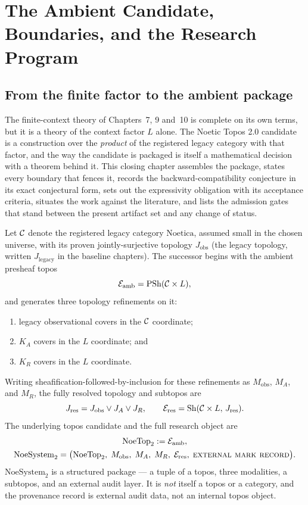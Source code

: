 \chapter{The Ambient Candidate, Boundaries, and the Research Program}
\label{ch12:chapter}

\section{From the finite factor to the ambient package}
\label{ch12:sec:ambient}

The finite-context theory of Chapters~7, 9 and~10 is complete on its own
terms, but it is a theory of the context factor $L$ alone. The Noetic Topos
2.0 candidate is a construction over the \emph{product} of the registered
legacy category with that factor, and the way the candidate is packaged is
itself a mathematical decision with a theorem behind it. This closing
chapter assembles the package, states every boundary that fences it, records
the backward-compatibility conjecture in its exact conjectural form, sets
out the expressivity obligation with its acceptance criteria, situates the
work against the literature, and lists the admission gates that stand
between the present artifact set and any change of status.

\begin{construction}
\label{ch12:con:package}
Let $\mathcal{C}$ denote the registered legacy category $\mathrm{Noetica}$, assumed
small in the chosen universe, with its proven jointly-surjective topology
$J_{\mathrm{obs}}$ (the legacy topology, written $J_{\mathrm{legacy}}$ in
the baseline chapters). The successor begins with the ambient presheaf topos
\[
\mathcal{E}_{\mathrm{amb}} = \mathrm{PSh}(\mathcal{C} \times L),
\]
and generates three topology refinements on it:
\begin{enumerate}
\item legacy observational covers in the $\mathcal{C}$ coordinate;
\item $K_A$ covers in the $L$ coordinate; and
\item $K_R$ covers in the $L$ coordinate.
\end{enumerate}
Writing sheafification-followed-by-inclusion for these refinements as
$M_{\mathrm{obs}}$, $M_A$, and $M_R$, the fully resolved topology and
subtopos are
\[
J_{\mathrm{res}} = J_{\mathrm{obs}} \vee J_A \vee J_R,
\qquad
\mathcal{E}_{\mathrm{res}} = \mathrm{Sh}(\mathcal{C} \times L,\, J_{\mathrm{res}}).
\]
The underlying topos candidate and the full research object are
\[
\begin{gathered}
\mathrm{NoeTop}_2 := \mathcal{E}_{\mathrm{amb}},\\
\mathrm{NoeSystem}_2 = \bigl( \mathrm{NoeTop}_2,\; M_{\mathrm{obs}},\;
M_A,\; M_R,\; \mathcal{E}_{\mathrm{res}},\; \textsc{external mark record} \bigr).
\end{gathered}
\]
$\mathrm{NoeSystem}_2$ is a structured package --- a tuple of a topos, three
modalities, a subtopos, and an external audit layer. It is \emph{not} itself
a topos or a category, and the provenance record is external audit data,
not an internal topos object.
\end{construction}

